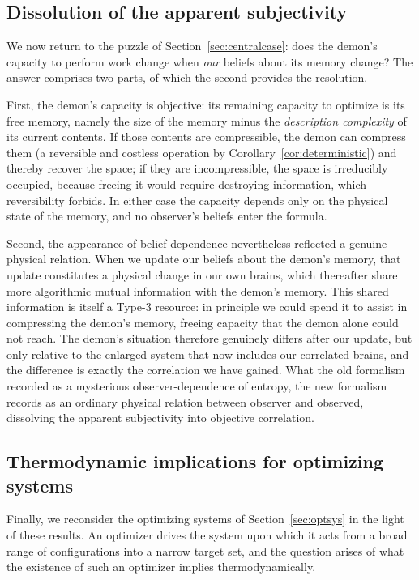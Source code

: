 \documentclass[10pt]{article}
\theoremstyle{definition}
\theoremstyle{remark}
\begin{document}
\subsection{Dissolution of the apparent subjectivity}
\label{sec:dissolve}

We now return to the puzzle of Section~\ref{sec:centralcase}: does the demon's capacity to perform work change when \emph{our} beliefs about its memory change? The answer comprises two parts, of which the second provides the resolution.

First, the demon's capacity is objective: its remaining capacity to optimize is its free memory, namely the size of the memory minus the \emph{description complexity} of its current contents. If those contents are compressible, the demon can compress them (a reversible and costless operation by Corollary~\ref{cor:deterministic}) and thereby recover the space; if they are incompressible, the space is irreducibly occupied, because freeing it would require destroying information, which reversibility forbids. In either case the capacity depends only on the physical state of the memory, and no observer's beliefs enter the formula.

Second, the appearance of belief-dependence nevertheless reflected a genuine physical relation. When we update our beliefs about the demon's memory, that update constitutes a physical change in our own brains, which thereafter share more algorithmic mutual information with the demon's memory. This shared information is itself a Type-3 resource: in principle we could spend it to assist in compressing the demon's memory, freeing capacity that the demon alone could not reach. The demon's situation therefore genuinely differs after our update, but only relative to the enlarged system that now includes our correlated brains, and the difference is exactly the correlation we have gained. What the old formalism recorded as a mysterious observer-dependence of entropy, the new formalism records as an ordinary physical relation between observer and observed, dissolving the apparent subjectivity into objective correlation.

\subsection{Thermodynamic implications for optimizing systems}
\label{sec:backtoflint}

Finally, we reconsider the optimizing systems of Section~\ref{sec:optsys} in the light of these results. An optimizer drives the system upon which it acts from a broad range of configurations into a narrow target set, and the question arises of what the existence of such an optimizer implies thermodynamically.
\end{document}
